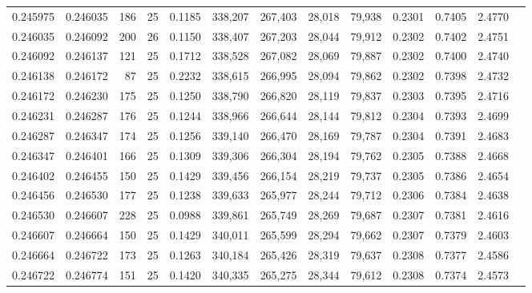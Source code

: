 \begin{tabular}{rrrrrrrrrrrrr}
0.245975 & 0.246035 &   186 &  25 &                                     0.1185 & 338,207 & 267,403 &  28,018 &  79,938 & 0.2301 & 0.7405 & 2.4770 \\
0.246035 & 0.246092 &   200 &  26 &                                     0.1150 & 338,407 & 267,203 &  28,044 &  79,912 & 0.2302 & 0.7402 & 2.4751 \\
0.246092 & 0.246137 &   121 &  25 &                                     0.1712 & 338,528 & 267,082 &  28,069 &  79,887 & 0.2302 & 0.7400 & 2.4740 \\
0.246138 & 0.246172 &    87 &  25 &                                     0.2232 & 338,615 & 266,995 &  28,094 &  79,862 & 0.2302 & 0.7398 & 2.4732 \\
0.246172 & 0.246230 &   175 &  25 &                                     0.1250 & 338,790 & 266,820 &  28,119 &  79,837 & 0.2303 & 0.7395 & 2.4716 \\
0.246231 & 0.246287 &   176 &  25 &                                     0.1244 & 338,966 & 266,644 &  28,144 &  79,812 & 0.2304 & 0.7393 & 2.4699 \\
0.246287 & 0.246347 &   174 &  25 &                                     0.1256 & 339,140 & 266,470 &  28,169 &  79,787 & 0.2304 & 0.7391 & 2.4683 \\
0.246347 & 0.246401 &   166 &  25 &                                     0.1309 & 339,306 & 266,304 &  28,194 &  79,762 & 0.2305 & 0.7388 & 2.4668 \\
0.246402 & 0.246455 &   150 &  25 &                                     0.1429 & 339,456 & 266,154 &  28,219 &  79,737 & 0.2305 & 0.7386 & 2.4654 \\
0.246456 & 0.246530 &   177 &  25 &                                     0.1238 & 339,633 & 265,977 &  28,244 &  79,712 & 0.2306 & 0.7384 & 2.4638 \\
0.246530 & 0.246607 &   228 &  25 &                                     0.0988 & 339,861 & 265,749 &  28,269 &  79,687 & 0.2307 & 0.7381 & 2.4616 \\
0.246607 & 0.246664 &   150 &  25 &                                     0.1429 & 340,011 & 265,599 &  28,294 &  79,662 & 0.2307 & 0.7379 & 2.4603 \\
0.246664 & 0.246722 &   173 &  25 &                                     0.1263 & 340,184 & 265,426 &  28,319 &  79,637 & 0.2308 & 0.7377 & 2.4586 \\
0.246722 & 0.246774 &   151 &  25 &                                     0.1420 & 340,335 & 265,275 &  28,344 &  79,612 & 0.2308 & 0.7374 & 2.4573 \\

\end{tabular}
